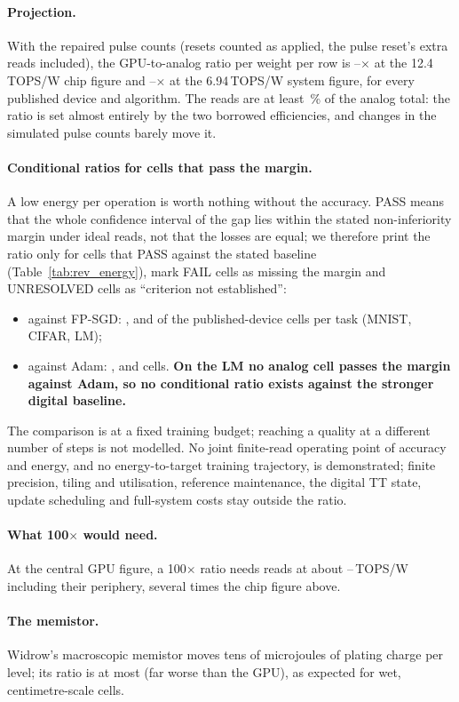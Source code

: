 \paragraph{Projection.} With the repaired pulse counts (resets counted as applied, the pulse reset's extra reads included), the
GPU-to-analog ratio per weight per row is \RVenChipMin--\RVenChipMax$\times$ at the 12.4\,TOPS/W chip figure and
\RVenSysMin--\RVenSysMax$\times$ at the 6.94\,TOPS/W system figure, for every published device and algorithm. The reads are at
least \RVenChipMvmShareMin\,\% of the analog total: the ratio is set almost entirely by the two borrowed efficiencies, and
changes in the simulated pulse counts barely move it.

\paragraph{Conditional ratios for cells that pass the margin.} A low energy per operation is worth nothing without the
accuracy. PASS means that the whole confidence interval of the gap lies within the stated non-inferiority margin under ideal reads,
not that the losses are equal; we therefore print the ratio only for cells that PASS against the stated baseline
(Table~\ref{tab:rev_energy}), mark FAIL cells as missing the margin and UNRESOLVED cells as ``criterion not established'':
\begin{itemize}
\item against FP-SGD: \RVenEqFpMnistN, \RVenEqFpCifarN{} and \RVenEqFpLmN{} of the \RVenCellsMnistN{} published-device cells per
      task (MNIST, CIFAR, LM);
\item against Adam: \RVenEqAdamMnistN, \RVenEqAdamCifarN{} and \RVenEqAdamLmN{} cells. \textbf{On the LM no analog cell passes
      the margin against Adam, so no conditional ratio exists against the stronger digital baseline.}
\end{itemize}
The comparison is at a fixed training budget; reaching a quality at a different number of steps is not modelled. No joint
finite-read operating point of accuracy and energy, and no energy-to-target training trajectory, is demonstrated; finite
precision, tiling and utilisation, reference maintenance, the digital TT state, update scheduling and full-system costs stay
outside the ratio.

\paragraph{What 100$\times$ would need.} At the central GPU figure, a 100$\times$ ratio needs reads at about
\RVenNeedTopsMin--\RVenNeedTopsMax\,TOPS/W including their periphery, several times the chip figure above.

\paragraph{The memistor.} Widrow's macroscopic memistor moves tens of microjoules of plating charge per level; its ratio is at
most \RVenWidrowRatioMax{} (far worse than the GPU), as expected for wet, centimetre-scale cells.


